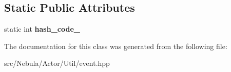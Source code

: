 \subsection*{\-Static \-Public \-Attributes}
\begin{DoxyCompactItemize}
\item 
\hypertarget{classNeb_1_1Event_1_1Actor_1_1Base_ab6711b6cd077caa473f0c3b7416a265f}{static int {\bfseries hash\-\_\-code\-\_\-}}\label{classNeb_1_1Event_1_1Actor_1_1Base_ab6711b6cd077caa473f0c3b7416a265f}

\end{DoxyCompactItemize}


\-The documentation for this class was generated from the following file\-:\begin{DoxyCompactItemize}
\item 
src/\-Nebula/\-Actor/\-Util/event.\-hpp\end{DoxyCompactItemize}
